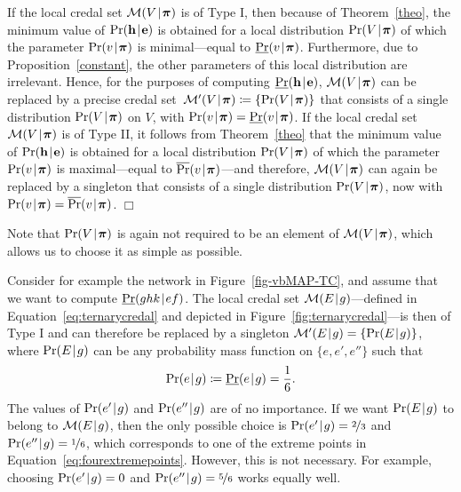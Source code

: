 \documentclass[10pt,a4paper]{paper}
\theoremstyle{definition}
\newcommand{\vbpi}{\boldsymbol\pi}
\newcommand{\hyp}{\mathbf{h}}
\newcommand{\ev}{\mathbf{e}}
\newcommand{\credal}{\mathcal{M}}
\newcommand{\newmid}{\hspace{0.9pt}\vert\hspace{0.9pt}}
\begin{document}
If the local credal set $\credal(V\newmid \vbpi)$ is of Type I, then because of Theorem~\ref{theo}, the minimum value of $\Pr(\hyp\newmid\ev)$ is obtained for a local distribution $\Pr(V\newmid\vbpi)$ of which the parameter $\Pr(v\newmid\vbpi)$ is minimal---equal to $\underline{\Pr}(v\newmid\vbpi)$. Furthermore, due to Proposition~\ref{constant}, the other parameters of this local distribution are irrelevant. Hence, for the purposes of computing $\underline{\Pr}(\hyp\newmid\ev)$, $\credal(V\newmid \vbpi)$ can be replaced by a precise credal set~$\credal'(V\newmid \vbpi)\coloneqq\{\Pr(V\newmid\vbpi)\}$ that consists of a single distribution $\Pr(V\newmid\vbpi)$ on $V$, with $\Pr(v\newmid\vbpi)=\underline{\Pr}(v\newmid\vbpi)$. 
If the local credal set $\credal(V\newmid \vbpi)$ is of Type II, it follows from Theorem~\ref{theo} that the minimum value of $\Pr(\hyp\newmid\ev)$ is obtained for a local distribution $\Pr(V\newmid\vbpi)$ of which the parameter $\Pr(v\newmid\vbpi)$ is maximal---equal to $\overline{\Pr}(v\newmid\vbpi)$---and therefore, $\credal(V\newmid \vbpi)$ can again be replaced by a singleton that consists of a single distribution $\Pr(V\newmid\vbpi)$, now with $\Pr(v\newmid\vbpi)=\overline{\Pr}(v\newmid\vbpi)$.
\hfill$\Box$

\bigskip

\noindent
Note that $\Pr(V\newmid\vbpi)$ is again not required to be an element of $\credal(V\newmid \vbpi)$, which allows us to choose it as simple as possible.

Consider for example the network in Figure~\ref{fig-vbMAP-TC}, and assume that we want to compute $\underline{\Pr}(ghk\newmid ef)$. The local credal set $\credal(E\newmid g)$---defined in Equation~\eqref{eq:ternarycredal} and depicted in Figure~\ref{fig:ternarycredal}---is then of Type I and can therefore be replaced by a singleton $\credal'(E\newmid g)=\{\Pr(E\newmid g)\}$, where $\Pr(E\newmid g)$ can be any probability mass function on $\{e,e',e''\}$ such that
\begin{equation*}
\Pr(e\newmid g)\coloneqq\underline{\Pr}(e\newmid g)=\frac{1}{6}.
\end{equation*}
The values of $\Pr(e'\newmid g)$ and $\Pr(e''\newmid g)$ are of no importance. If we want $\Pr(E\newmid g)$ to belong to $\credal(E\newmid g)$, then the only possible choice is $\Pr(e'\newmid g)=\nicefrac{2}{3}$ and $\Pr(e''\newmid g)=\nicefrac{1}{6}$, which corresponds to one of the extreme points in Equation~\eqref{eq:fourextremepoints}. However, this is not necessary. For example, choosing $\Pr(e'\newmid g)=0$ and $\Pr(e''\newmid g)=\nicefrac{5}{6}$ works equally well.
\end{document}
